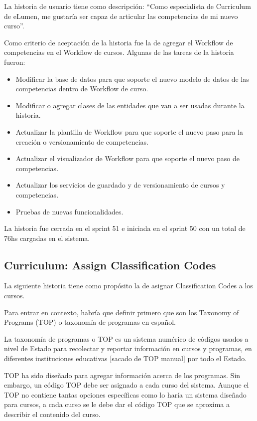 La historia de usuario tiene como descripción: “Como especialista de Curriculum de eLumen, me gustaría ser capaz de articular las competencias de mi nuevo curso”.

Como criterio de aceptación de la historia fue la de agregar el Workflow de competencias en el Workflow de cursos. Algunas de las tareas de la historia fueron:
\begin{itemize}
	\item Modificar la base de datos para que soporte el nuevo modelo de datos de las competencias dentro de Workflow de curso.
	\item Modificar o agregar clases de las entidades que van a ser usadas durante la historia.
	\item Actualizar la plantilla de Workflow para que soporte el nuevo paso para la creación o versionamiento de competencias.
	\item Actualizar el visualizador de Workflow para que soporte el nuevo paso de competencias.
	\item Actualizar los servicios de guardado y de versionamiento de cursos y competencias.
	\item Pruebas de nuevas funcionalidades.
\end{itemize}

La historia fue cerrada en el sprint 51 e iniciada en el sprint 50 con un total de 76hs cargadas en el sistema.

\subsection{Curriculum: Assign Classification Codes}
La siguiente historia tiene como propósito la de asignar Classification Codes a los cursos.

Para entrar en contexto, habría que definir primero que son los Taxonomy of Programs (TOP) o taxonomía de programas en español.

La taxonomía de programas o TOP es un sistema numérico de códigos usados a nivel de Estado para recolectar y reportar información en cursos y programas, en diferentes instituciones educativas [sacado de TOP manual] por todo el Estado. 

TOP ha sido diseñado para agregar información acerca de los programas. Sin embargo, un código TOP debe ser asignado a cada curso del sistema. Aunque el TOP no contiene tantas opciones específicas como lo haría un sistema diseñado para cursos, a cada curso se le debe dar el código TOP que se aproxima a describir el contenido del curso.

